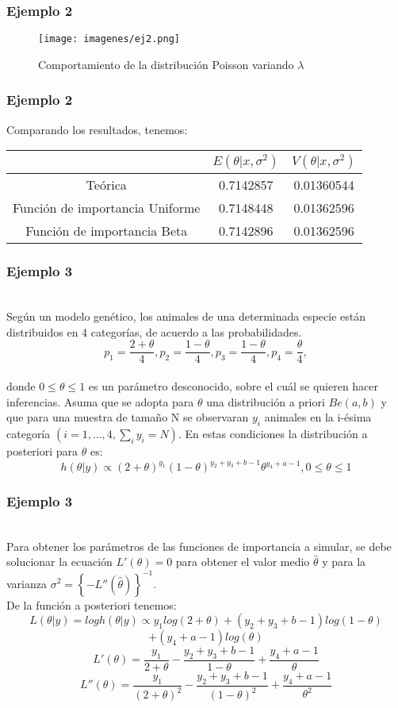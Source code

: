 \documentclass[12pt]{beamer}
\begin{document}
\begin{frame}
\frametitle{Ejemplo 2}
\begin{figure}[!h]
    \begin{center}
        \texttt{[image: imagenes/ej2.png]}
        \caption{Comportamiento de la distribución Poisson variando $\lambda$}
        \label{fig:Densidad}
    \end{center}
\end{figure}
\end{frame}

\begin{frame}
\frametitle{Ejemplo 2}
Comparando los resultados, tenemos:
\begin{tabular}{|c|c|c|}
\hline 
 & $E(\theta|x,\sigma^2)$ & $V(\theta|x,\sigma^2)$ \\ 
\hline 
Teórica & 0.7142857 & 0.01360544 \\ 
Función de importancia Uniforme &  0.7148448 & 0.01362596 \\ 
Función de importancia Beta & 0.7142896 & 0.01362596 \\
\hline 
\end{tabular} 
\end{frame}

\begin{frame}
\frametitle{Ejemplo 3}
~\\Según un modelo genético, los animales de una determinada especie están distribuidos en 4 categorías, de acuerdo a las probabilidades.
$$p_{1}=\frac{2+\theta}{4}, p_{2}=\frac{1-\theta}{4}, p_{3}=\frac{1-\theta}{4}, p_{4}=\frac{\theta}{4},$$
~\\donde $0\leq \theta \leq 1$ es un parámetro desconocido, sobre el cuál se quieren hacer inferencias. Asuma que se adopta para $\theta$ una distribución a priori $Be(a,b)$ y que para una muestra de tamaño N se observaran $y_{i}$ animales en la i-ésima categoría $(i=1,...,4, \sum_{i}y_{i}=N)$. En estas condiciones la distribución a posteriori para $\theta$ es:
$$h(\theta|y)\propto(2+\theta)^{y_{1}}(1-\theta)^{y_{2}+y_{3}+b-1}\theta^{y_{4}+a-1},   0\leq\theta\leq1 $$
\end{frame}

\begin{frame}
\frametitle{Ejemplo 3}
~\\Para obtener los parámetros de las funciones de importancia a simular, se debe solucionar la ecuación $L'(\theta)=0$ para obtener el valor medio $\hat{\theta}$ y  para la varianza $\sigma^2=\left\lbrace -L''(\hat{\theta})\right\rbrace ^{-1}$.
~\\De la función a posteriori tenemos:
$$L(\theta|y)=log h(\theta|y)\propto y_{1}log(2+\theta)+(y_{2}+y_{3}+b-1)log(1-\theta)$$
$$+(y_{4}+a-1)log(\theta)$$
$$L'(\theta)=\frac{y_{1}}{2+\theta}-\frac{y_{2}+y_{3}+b-1}{1-\theta}+\frac{y_{4}+a-1}{\theta}$$
$$L''(\theta)=\frac{y_{1}}{(2+\theta)^2}-\frac{y_{2}+y_{3}+b-1}{(1-\theta)^2}+\frac{y_{4}+a-1}{\theta^2}$$
\end{frame}
\end{document}
